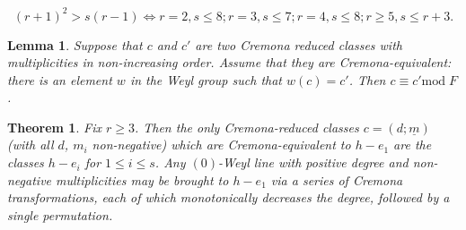 \documentclass[10pt,a4paper]{amsart}
\newtheorem{lemma}{Lemma}
\newtheorem{theorem}{Theorem}
\def\mod{\text{mod}\;}
\begin{document}
\begin{equation}\label{finiteWeylrs}
(r+1)^2 > s(r-1) \iff r=2, s \leq 8; r=3, s \leq 7; r=4, s \leq 8; r\geq 5, s \leq r+3.
\end{equation}

\begin{lemma}\label{twoCremonareducedclasses}
Suppose that $c$ and $c'$ are two Cremona reduced classes
with multiplicities in non-increasing order.
Assume that they are Cremona-equivalent:
there is an element $w$ in the Weyl group such that $w(c)=c'$.
Then $c \equiv c' \mod F$.
\end{lemma}

\begin{theorem}\label{thm:0weyllines}
Fix $r\geq 3$.
Then the only Cremona-reduced classes $c = (d;\underline{m})$
(with all $d$, $m_i$ non-negative)
which are Cremona-equivalent to $h-e_1$
are the classes $h-e_i$ for $1 \leq i \leq s$.
Any $(0)$-Weyl line with positive degree and non-negative multiplicities
may be brought to $h-e_1$ via a series of Cremona transformations,
each of which monotonically decreases the degree,
followed by a single permutation.
\end{theorem}
\end{document}
